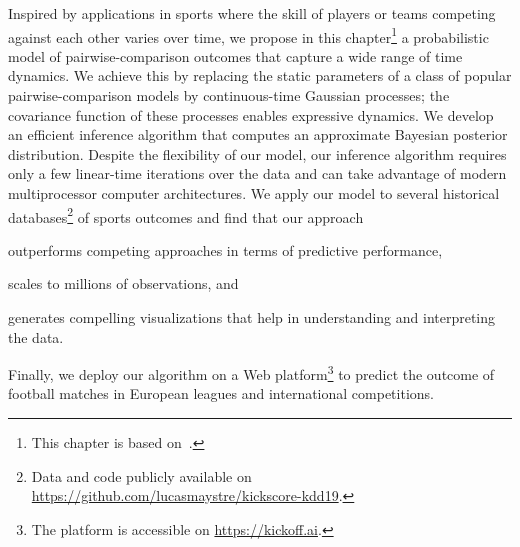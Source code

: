Inspired by applications in sports where the skill of players or teams competing against each other varies over time, we propose in this chapter\footnote{This chapter is based on~\citet{maystre2019pairwise}.} a probabilistic model of pairwise-comparison outcomes that capture a wide range of time dynamics.
We achieve this by replacing the static parameters of a class of popular pairwise-comparison models by continuous-time Gaussian processes;
the covariance function of these processes enables expressive dynamics.
We develop an efficient inference algorithm that computes an approximate Bayesian posterior distribution.
Despite the flexibility of our model, our inference algorithm requires only a few linear-time iterations over the data and can take advantage of modern multiprocessor computer architectures.
We apply our model to several historical databases\footnote{Data and code publicly available on \href{https://github.com/lucasmaystre/kickscore-kdd19}{https://github.com/lucasmaystre/kickscore-kdd19}.} of sports outcomes and find that our approach
\begin{enuminline}
	\item outperforms competing approaches in terms of predictive performance,
	\item scales to millions of observations, and
	\item generates compelling visualizations that help in understanding and interpreting the data.
\end{enuminline}
Finally, we deploy our algorithm on a Web platform\footnote{The platform is accessible on \href{https://kickoff.ai}{https://kickoff.ai}.} to predict the outcome of football matches in European leagues and international competitions.
